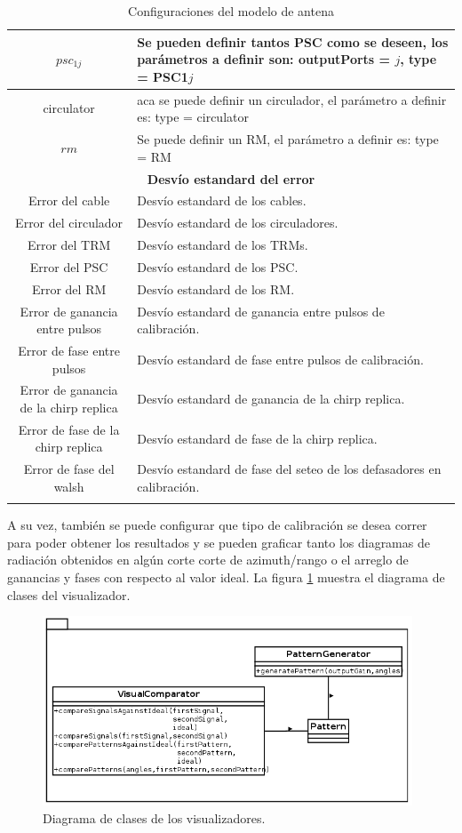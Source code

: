 \begin{center}
\begin{longtable}{|c|p{9cm}|}
	$psc_{1j}$ & Se pueden definir tantos PSC como se deseen, los parámetros a definir son: outputPorts = $j$, type = PSC1$j$ \tabularnewline \hline 
	circulator & aca se puede definir un circulador, el parámetro a definir es: type = circulator \tabularnewline \hline 
	$rm$ & Se puede definir un RM, el parámetro a definir es: type = RM \tabularnewline \hline 
	\multicolumn{2}{|c|}{\textbf{Desvío estandard del error}} \\
	\hline
	Error del cable & Desvío estandard de los cables. \tabularnewline \hline 
	Error del circulador & Desvío estandard de los circuladores. \tabularnewline \hline 
	Error del TRM & Desvío estandard de los TRMs. \tabularnewline \hline 
	Error del PSC & Desvío estandard de los PSC. \tabularnewline \hline 
	Error del RM & Desvío estandard de los RM. \tabularnewline \hline 
	Error de ganancia entre pulsos & Desvío estandard de ganancia entre pulsos de calibración. \tabularnewline \hline 
	Error de fase entre pulsos & Desvío estandard de fase entre pulsos de calibración. \tabularnewline \hline 
	Error de ganancia de la chirp replica & Desvío estandard de ganancia de la chirp replica. \tabularnewline \hline 
	Error de fase de la chirp replica & Desvío estandard de fase de la chirp replica. \tabularnewline \hline 
	Error de fase del walsh & Desvío estandard de fase del seteo de los defasadores en calibración. \tabularnewline \hline 
	\caption{Configuraciones del modelo de antena}
  \end{longtable}
  \label{tab:conf_modelo_antena}
\end{center}

A su vez, también se puede configurar que tipo de calibración se desea correr para poder obtener los resultados y se pueden 
graficar tanto los diagramas de radiación obtenidos en algún corte corte de azimuth/rango o el arreglo de ganancias y fases con 
respecto al valor ideal. La figura \ref{fig:visualPackage} muestra el diagrama de clases del visualizador.

\begin{figure}[H]
 \centering
 \includegraphics[width=11cm]{gfx/visualPackage.png}
 \caption{Diagrama de clases de los visualizadores.}
 \label{fig:visualPackage}
\end{figure}

